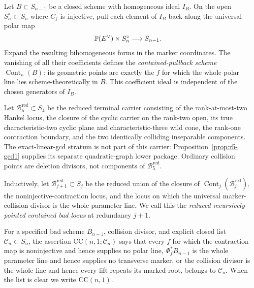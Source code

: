 \begin{definition}
Let \(B\subset S_{n-1}\) be a closed scheme with homogeneous ideal
\(I_B\).  On the open \(S_n^\circ\subset S_n\) where \(C_f\) is
injective, pull each element of \(I_B\) back along the universal polar
map
\[
 \mathbb P(E^\vee)\times S_n^\circ\longrightarrow S_{n-1}.
\]
Expand the resulting bihomogeneous forms in the marker coordinates.
The vanishing of all their coefficients defines the
\emph{contained-pullback scheme} \(\operatorname{Cont}_n(B)\):
its geometric points are exactly the \(f\) for which the whole polar
line lies scheme-theoretically in \(B\).  This coefficient ideal is
independent of the chosen generators of \(I_B\).

Let \(\mathcal B_5^{\mathrm{red}}\subset S_4\) be the reduced terminal
carrier consisting of the rank-at-most-two Hankel locus, the closure of
the cyclic carrier on the rank-two open, its true characteristic-two
cyclic plane and characteristic-three wild cone, the rank-one
contraction boundary, and the two identically colliding inseparable
components.  The exact-linear-gcd stratum is not part of this carrier:
Proposition~\ref{prop:r5-gcd1} supplies its separate quadratic-graph
lower package.  Ordinary collision points are deletion divisors, not
components of \(\mathcal B_5^{\mathrm{red}}\).

Inductively, let
\(\mathcal B_{j+1}^{\mathrm{red}}\subset S_j\) be the reduced union of
the closure of
\(\operatorname{Cont}_j(\mathcal B_j^{\mathrm{red}})\), the
noninjective-contraction locus, and the locus on which the universal
marker-collision divisor is the whole parameter line.  We call this
the \emph{reduced recursively pointed contained bad locus} at
redundancy \(j+1\).
\end{definition}

\begin{definition}
\label{def:contained}
For a specified bad scheme \(B_{n-1}\), collision divisor, and explicit
closed list \(\mathcal C_n\subset S_n\), the assertion
\(\mathrm{CC}(n,1;\mathcal C_n)\) says that every \(f\) for which the
contraction map is noninjective and hence supplies no polar line,
\(\Phi_f^*B_{n-1}\) is the whole parameter line and hence supplies no
transverse marker, or the collision divisor is the whole line and
hence every lift repeats its marked root, belongs to \(\mathcal C_n\).
When the list is clear we write
\(\mathrm{CC}(n,1)\).
\end{definition}


